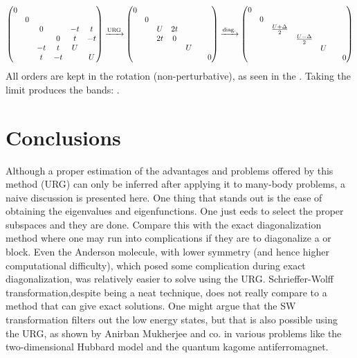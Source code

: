 \documentclass[12pt]{article}
\begin{document}
\begin{gather*}
\begin{pmatrix}
	0 &&&&&\\
	& 0&&&&\\
	&& 0 && -t & t \\
	&&& 0 & t & -t \\
	&& -t & t & U & \\
	&& t & -t && U \\
\end{pmatrix}
\xrightarrow{\text{URG}}
\begin{pmatrix}
	0 &&&&& \\
	& 0 &&&& \\
	&& U & 2t && \\
	&& 2t & 0 && \\
	&&&& U & \\
	&&&&& & 0 \\
\end{pmatrix}
\xrightarrow{\text{diag.}}
\begin{pmatrix}
	0 &&&&& \\
	& 0 &&&& \\
	&& \frac{U+\Delta}{2} &&& \\
	&&& \frac{U-\Delta}{2} && \\
	&&&& U & \\
	&&&&& & 0 \\
\end{pmatrix}
\end{gather*}
All orders are kept in the rotation (non-perturbative), as seen in the . Taking the limit  produces the bands: .

\newpage

\section*{Conclusions}
Although a proper estimation of the advantages and problems offered by this method (URG) can only be inferred after applying it to many-body problems, a naive discussion is presented here. One thing that stands out is the ease of obtaining the eigenvalues and eigenfunctions. One just eeds to select the proper subspaces and they are done. Compare this with the exact diagonalization method where one may run into complications if they are to diagonalize a  or  block. Even the Anderson molecule, with lower symmetry (and hence higher computational difficulty), which posed some complication during exact diagonalization, was relatively easier to solve using the URG. Schrieffer-Wolff transformation,despite being a neat technique, does not really compare to a method that can give exact solutions. One might argue that the SW transformation filters out the low energy states, but that is also possible using the URG, as shown by Anirban Mukherjee and co. in various problems like the two-dimensional Hubbard model and the quantum kagome antiferromagnet. 
\end{document}
